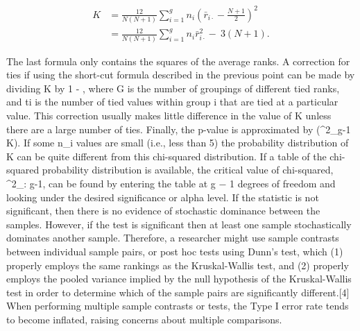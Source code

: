 \begin{align}
K & = \frac{12}{N(N+1)}\sum_{i=1}^g n_i \left(\bar{r}_{i\cdot} - \frac{N+1}{2}\right)^2 \\ & = \frac{12}{N(N+1)}\sum_{i=1}^g n_i \bar{r}_{i\cdot }^2 -\ 3(N+1).
\end{align}

The last formula only contains the squares of the average ranks.
A correction for ties if using the short-cut formula described in the previous point can be made by dividing K by 1 - , where G is the number of groupings of different tied ranks, and ti is the number of tied values within group i that are tied at a particular value. This correction usually makes little difference in the value of K unless there are a large number of ties.
Finally, the p-value is approximated by \Pr(\chi^2_{g-1} \ge K). If some n_i values are small (i.e., less than 5) the probability distribution of K can be quite different from this chi-squared distribution. If a table of the chi-squared probability distribution is available, the critical value of chi-squared, \chi^2_{\alpha: g-1}, can be found by entering the table at g − 1 degrees of freedom and looking under the desired significance or alpha level.
If the statistic is not significant, then there is no evidence of stochastic dominance between the samples. However, if the test is significant then at least one sample stochastically dominates another sample. Therefore, a researcher might use sample contrasts between individual sample pairs, or post hoc tests using Dunn's test, which (1) properly employs the same rankings as the Kruskal-Wallis test, and (2) properly employs the pooled variance implied by the null hypothesis of the Kruskal-Wallis test in order to determine which of the sample pairs are significantly different.[4] When performing multiple sample contrasts or tests, the Type I error rate tends to become inflated, raising concerns about multiple comparisons.
